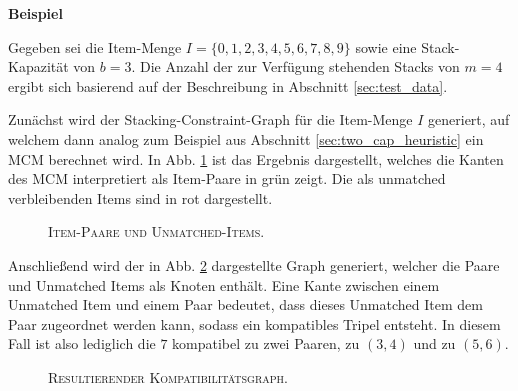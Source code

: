 \textbf{Beispiel}

Gegeben sei die Item-Menge $I = \{0, 1, 2, 3, 4, 5, 6, 7, 8, 9\}$ sowie eine Stack-Kapazität von $b = 3$. Die Anzahl der
zur Verfügung stehenden Stacks von $m = 4$ ergibt sich basierend auf der Beschreibung in Abschnitt \ref{sec:test_data}.

Zunächst wird der Stacking-Constraint-Graph für die Item-Menge $I$ generiert, auf welchem dann analog zum Beispiel aus Abschnitt
\ref{sec:two_cap_heuristic} ein \textsc{MCM} berechnet wird. In Abb. \ref{fig:pairs_and_unmatched} ist das Ergebnis dargestellt,
welches die Kanten des \textsc{MCM} interpretiert als Item-Paare in grün zeigt. Die als unmatched verbleibenden Items sind in rot dargestellt.

\begin{figure}[H]
\centering
{}
\caption{\textsc{Item-Paare und Unmatched-Items.}}
\label{fig:pairs_and_unmatched}
\end{figure}

Anschließend wird der in Abb. \ref{fig:graph_for_pairs_and_unmatched} dargestellte Graph generiert, welcher die Paare und
Unmatched Items als Knoten enthält. Eine Kante zwischen einem Unmatched Item und einem Paar bedeutet, dass dieses Unmatched
Item dem Paar zugeordnet werden kann, sodass ein kompatibles Tripel entsteht.
In diesem Fall ist also lediglich die $7$ kompatibel zu zwei Paaren, zu $(3, 4)$ und zu $(5, 6)$.

\begin{figure}[H]
\centering
{}
\caption{\textsc{Resultierender Kompatibilitätsgraph.}}
\label{fig:graph_for_pairs_and_unmatched}
\end{figure}


